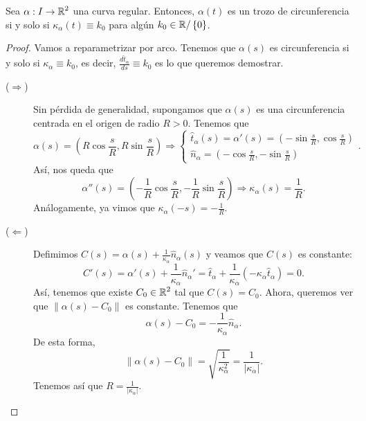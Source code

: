 \begin{prop}
	Sea $\displaystyle \alpha : I \to \mathbb{R}^{2} $ una curva regular. Entonces,
	$\displaystyle \alpha\left(t\right) $ es un trozo de circunferencia si y solo si $\displaystyle \kappa_{\alpha }\left(t\right)\equiv k_{0} $ para algún $\displaystyle k_{0} \in \mathbb{R}/ \left\{ 0\right\}  $. 
\end{prop}
\begin{proof}
Vamos a reparametrizar por arco. Tenemos que $\displaystyle \alpha\left(s\right) $ es circunferencia si y solo si $\displaystyle \kappa_{\alpha }\equiv k_{0} $, es decir, $\displaystyle \frac{d\hat{t}_{\alpha }}{d s}\equiv k_{0} $ es lo que queremos demostrar.
\begin{description}
\item[($\displaystyle \Rightarrow $)] Sin pérdida de generalidad, supongamos que $\displaystyle \alpha \left(s\right) $ es una circunferencia centrada en el origen de radio $\displaystyle R >0 $. Tenemos que 
	\[\alpha\left(s\right)=\left(R\cos \frac{s}{R}, R \sin \frac{s}{R}\right) \Rightarrow
	\begin{cases}
	\hat{t}_{\alpha }\left(s\right)=\alpha'\left(s\right)=\left(-\sin \frac{s}{R}, \cos \frac{s}{R}\right) \\
	\hat{n}_{\alpha }=\left(-\cos\frac{s}{R}, -\sin \frac{s}{R}\right)
	\end{cases}
	.\]
	Así, nos queda que 
	\[\alpha''\left(s\right)=\left(-\frac{1}{R}\cos \frac{s}{R}, -\frac{1}{R}\sin \frac{s}{R}\right)\Rightarrow \kappa_{\alpha }\left(s\right)= \frac{1}{R} .\]
Análogamente, ya vimos que $\displaystyle \kappa_{\alpha }\left(-s\right)=-\frac{1}{R} $. 
\item[($\displaystyle \Leftarrow $)] Defimimos $\displaystyle C\left(s\right)=\alpha\left(s\right)+\frac{1}{\kappa_{\alpha}}\hat{n}_{\alpha }\left(s\right) $ y veamos que $\displaystyle C\left(s\right)$ es constante:
	\[C'\left(s\right)=\alpha'\left(s\right)+\frac{1}{\kappa_{\alpha}}\hat{n}_{\alpha }'=\hat{t}_{\alpha }+\frac{1}{\kappa_{\alpha }}\left(-\kappa_{\alpha }\hat{t}_{\alpha }\right)=0 .\]
	Así, tenemos que existe $\displaystyle C_{0} \in \mathbb{R}^{2} $ tal que $\displaystyle C\left(s\right)=C_{0} $. Ahora, queremos ver que $\displaystyle \|\alpha\left(s\right)-C_{0}\| $ es constante. Tenemos que
	\[ \alpha\left(s\right)-C_{0}=-\frac{1}{\kappa_{\alpha }}\hat{n}_{\alpha } .\]
De esta forma, 
\[\|\alpha\left(s\right)-C_{0}\|=\sqrt{\frac{1}{\kappa_{\alpha }^{2}}} = \frac{1}{ \left|\kappa_{\alpha }\right|} .\]
Tenemos así que $\displaystyle R = \frac{1}{ \left|\kappa_{\alpha }\right|} $. 
\end{description}
\end{proof}
